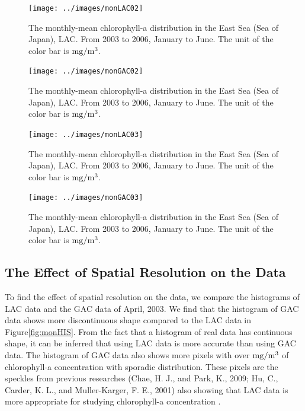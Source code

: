 \begin{figure}[p]
	\centering
	\texttt{[image: ../images/monLAC02]}\\
	\caption{The monthly-mean chlorophyll-a distribution in the East Sea (Sea of Japan), LAC. From 2003 to 2006, January to June. The unit of the color bar is $\rm mg/m^3$.}
	\label{fig:monLAC02}
\end{figure}

\begin{figure}[p]
	\centering
	\texttt{[image: ../images/monGAC02]}\\
	\caption{The monthly-mean chlorophyll-a distribution in the East Sea (Sea of Japan), LAC. From 2003 to 2006, January to June. The unit of the color bar is $\rm mg/m^3$.}
	\label{fig:monGAC02}
\end{figure}

\begin{figure}[p]
	\centering
	\texttt{[image: ../images/monLAC03]}\\
	\caption{The monthly-mean chlorophyll-a distribution in the East Sea (Sea of Japan), LAC. From 2003 to 2006, January to June. The unit of the color bar is $\rm mg/m^3$.}
	\label{fig:monLAC03}
\end{figure}

\begin{figure}[p]
	\centering
	\texttt{[image: ../images/monGAC03]}\\
	\caption{The monthly-mean chlorophyll-a distribution in the East Sea (Sea of Japan), LAC. From 2003 to 2006, January to June. The unit of the color bar is $\rm mg/m^3$.}
	\label{fig:monGAC03}
\end{figure}


\newpage
\subsection{The Effect of Spatial Resolution on the Data}
 
To find the effect of spatial resolution on the data, we compare the histograms of LAC data and the GAC data of April, 2003. We find that the histogram of GAC data shows more discontinuous shape compared to the LAC data in Figure\ref{fig:monHIS}. From the fact that a histogram of real data has continuous shape, it can be inferred that using LAC data is more accurate than using GAC data. The histogram of GAC data also shows more pixels with over $\rm mg/m^3$ of chlorophyll-a concentration with sporadic distribution. These pixels are the speckles from previous researches (Chae, H. J., and Park, K., 2009; Hu, C., Carder, K. L., and Muller-Karger, F. E., 2001) also showing that LAC data is more appropriate for studying chlorophyll-a concentration \cite{chae2009characteristics,hu2001precise}.
  
